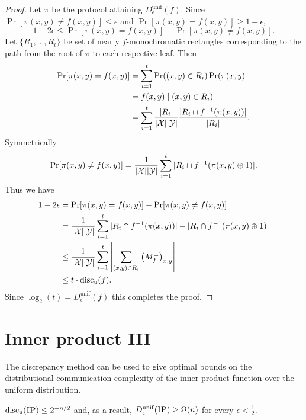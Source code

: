 \begin{proof}
Let $\pi$ be the protocol attaining $D_\epsilon^{\mathrm{unif}}(f)$. Since $\Pr[\pi(x,y) \neq f(x,y)] \leq \epsilon$ and $\Pr[\pi(x,y) = f(x,y)] \geq 1-\epsilon$,
$$1-2\epsilon \leq \Pr[\pi(x,y) = f(x,y)] - \Pr[\pi(x,y) \neq f(x,y)].$$
Let $\{R_1, \dots, R_t\}$ be set of nearly $f$-monochromatic rectangles corresponding to the path from the root of $\pi$ to each respective leaf. Then
\begin{align*}\Pr[\pi(x,y) = f(x,y)] &= \sum_{i=1}^t \Pr((x,y) \in R_i)\Pr(\pi(x,y) \\
&= f(x,y) \mid(x,y) \in R_i)\\
&= \sum_{i=1}^t \frac{|R_i|}{|\mathcal{X}||\mathcal{Y}|}\frac{|R_i\cap f^{-1}(\pi(x,y))|}{|R_i|}.
\end{align*}
Symmetrically
$$\Pr[\pi(x,y) \neq f(x,y)] = \frac{1}{|\mathcal{X}||\mathcal{Y}|} \sum_{i=1}^t|R_i \cap f^{-1}(\pi(x,y)\oplus 1)|.$$
Thus we have
\begin{align*}1-2\epsilon &= \Pr[\pi(x,y) = f(x,y)] - \Pr[\pi(x,y) \neq f(x,y)] \\
&= \frac{1}{|\mathcal{X}||\mathcal{Y}|} \sum_{i=1}^t|R_i\cap f^{-1}(\pi(x,y))| -|R_i \cap f^{-1}(\pi(x,y)\oplus 1)| \\
&\leq \frac{1}{|\mathcal{X}||\mathcal{Y}|} \sum_{i=1}^t  \left| \sum_{(x,y) \in R_i} \big(M^{\pm}_f\big)_{x,y} \right|\\
&\leq t\cdot\mathrm{disc_u}(f).\end{align*}
Since $\log_2(t) = D_\epsilon^{\mathrm{unif}}(f)$ this completes the proof.
\end{proof}


\newpage \section{Inner product III}

The discrepancy method can be used to give optimal bounds on the distributional communication complexity of the inner product function over the uniform distribution.

\begin{theorem}
$\mathrm{disc_u}(\textsc{IP}) \le 2^{-n/2}$ and, as a result, $D_\epsilon^{\mathrm{unif}}(\textsc{IP}) \ge \Omega(n)$ for every $\epsilon < \frac12$.
\end{theorem}

